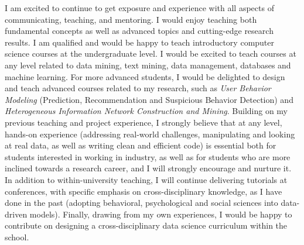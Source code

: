 \documentclass[10.5pt]{article}
\begin{document}
\vskip 0.12in
\vskip 0.02in

I am excited to continue to get exposure and experience with all aspects of communicating, teaching, and mentoring. I would enjoy teaching both fundamental concepts as well as advanced topics and cutting-edge research results. I am qualified and would be happy to teach introductory computer science courses at the undergraduate level. I would be excited to teach courses at any level related to data mining, text mining, data management, databases and machine learning. For more advanced students, I would be delighted to design and teach advanced courses related to my research, such as \textit{User Behavior Modeling} (Prediction, Recommendation and Suspicious Behavior Detection) and \textit{Heterogeneous Information Network Construction and Mining}. Building on my previous teaching and project experience, I strongly believe that at any level, hands-on experience (addressing real-world challenges, manipulating and looking at real data, as well as writing clean and efficient code) is essential both for students interested in working in industry, as well as for students who are more inclined towards a research career, and I will strongly encourage and nurture it. In addition to within-university teaching, I will continue delivering tutorials at conferences, with specific emphasis on cross-disciplinary knowledge, as I have done in the past (adopting behavioral, psychological and social sciences into data-driven models). Finally, drawing from my own experiences, I would be happy to contribute on designing a cross-disciplinary data science curriculum within the school.

\vspace{-0.1in}


\end{document}
